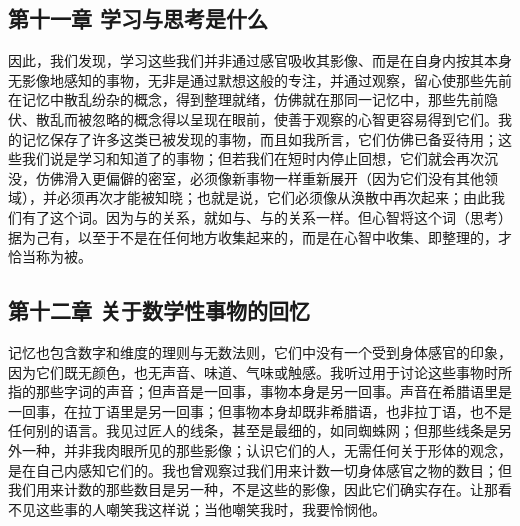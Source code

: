 
\subsection{第十一章 学习与思考是什么}

因此，我们发现，学习这些我们并非通过感官吸收其影像、而是在自身内按其本身无影像地感知的事物，无非是通过默想这般的专注，并通过观察，留心使那些先前在记忆中散乱纷杂的概念，得到整理就绪，仿佛就在那同一记忆中，那些先前隐伏、散乱而被忽略的概念得以呈现在眼前，使善于观察的心智更容易得到它们。我的记忆保存了许多这类已被发现的事物，而且如我所言，它们仿佛已备妥待用；这些我们说是学习和知道了的事物；但若我们在短时内停止回想，它们就会再次沉没，仿佛滑入更偏僻的密室，必须像新事物一样重新展开（因为它们没有其他领域），并必须再次才能被知晓；也就是说，它们必须像从涣散中再次起来；由此我们有了这个词。因为与的关系，就如与、与的关系一样。但心智将这个词（思考）据为己有，以至于不是在任何地方收集起来的，而是在心智中收集、即整理的，才恰当称为被。\par


\subsection{第十二章 关于数学性事物的回忆}

记忆也包含数字和维度的理则与无数法则，它们中没有一个受到身体感官的印象，因为它们既无颜色，也无声音、味道、气味或触感。我听过用于讨论这些事物时所指的那些字词的声音；但声音是一回事，事物本身是另一回事。声音在希腊语里是一回事，在拉丁语里是另一回事；但事物本身却既非希腊语，也非拉丁语，也不是任何别的语言。我见过匠人的线条，甚至是最细的，如同蜘蛛网；但那些线条是另外一种，并非我肉眼所见的那些影像；认识它们的人，无需任何关于形体的观念，是在自己内感知它们的。我也曾观察过我们用来计数一切身体感官之物的数目；但我们用来计数的那些数目是另一种，不是这些的影像，因此它们确实存在。让那看不见这些事的人嘲笑我这样说；当他嘲笑我时，我要怜悯他。\par


